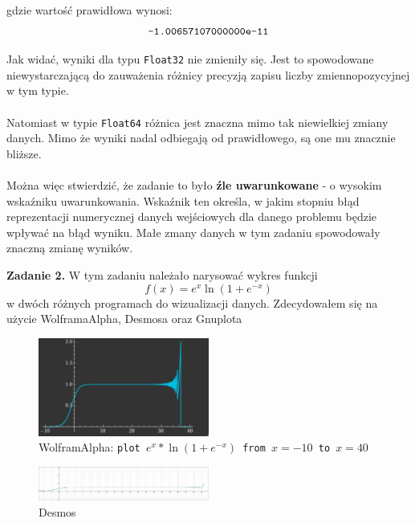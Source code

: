 \documentclass[15pt, a4paper]{article}
\begin{document}
\vspace{0.5cm}

\noindent gdzie wartość prawidłowa wynosi: \[\verb|-1.00657107000000e-11|\]

Jak widać, wyniki dla typu \verb|Float32| nie zmieniły się. Jest to spowodowane niewystarczającą do zauważenia różnicy precyzją zapisu liczby zmiennopozycyjnej w tym typie.\\\\
Natomiast w typie \verb|Float64| różnica jest znaczna mimo tak niewielkiej zmiany danych. Mimo że wyniki nadal odbiegają od prawidłowego, są one mu znacznie bliższe. \\\\
Można więc stwierdzić, że zadanie to było \textbf{źle uwarunkowane} - o wysokim wskaźniku uwarunkowania. Wskaźnik ten określa, w jakim stopniu błąd reprezentacji numerycznej danych wejściowych dla danego problemu będzie wpływać na błąd wyniku. Małe zmany danych w tym zadaniu spowodowały znaczną zmianę wyników. 

\vspace{0.5cm}

\noindent\hrulefill


\vspace{0.5cm}

\noindent\textbf{Zadanie 2.} W tym zadaniu należało narysować wykres funkcji \[f(x) = e^{x}\ln(1 + e^{-x})\] 
w dwóch różnych programach do wizualizacji danych. Zdecydowałem się na użycie WolframaAlpha, Desmosa oraz Gnuplota

\begin{figure}[h]
    \centering
    \includegraphics[width=0.5\textwidth]{img/wolfram1.png}  
    \caption{WolframAlpha: \texttt{plot $e^{x} * \ln(1 + e^{-x})$ from $x = -10$ to $x = 40$}}
\end{figure}

\begin{figure}[h]
    \centering
    \includegraphics[width=0.5\textwidth]{img/desmos1.png}
    \caption{Desmos}
\end{figure}
\end{document}
